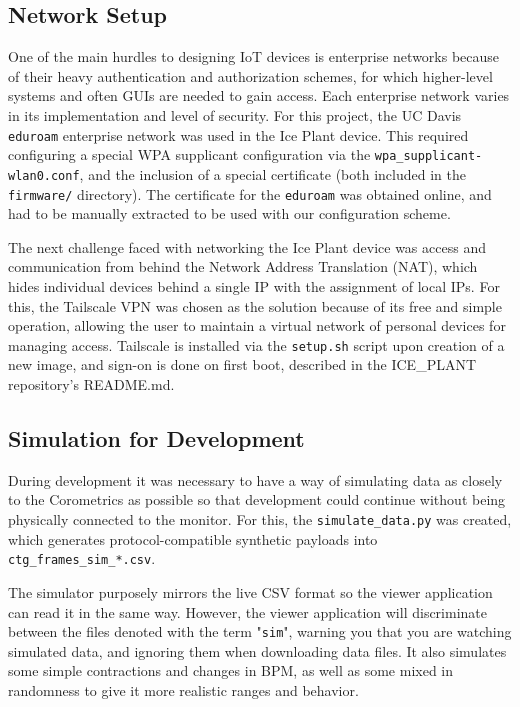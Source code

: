 \documentclass[11pt]{article}
\begin{document}
\subsection*{Network Setup}
One of the main hurdles to designing IoT devices is enterprise networks because of their heavy authentication and authorization schemes, for which higher-level systems and often GUIs are needed to gain access. Each enterprise network varies in its implementation and level of security. For this project, the UC Davis \texttt{eduroam} enterprise network was used in the Ice Plant device. This required configuring a special WPA supplicant configuration via the \texttt{wpa\_supplicant-wlan0.conf}, and the inclusion of a special certificate (both included in the \texttt{firmware/} directory). The certificate for the \texttt{eduroam} was obtained online, and had to be manually extracted to be used with our configuration scheme. 

The next challenge faced with networking the Ice Plant device was access and communication from behind the Network Address Translation (NAT), which hides individual devices behind a single IP with the assignment of local IPs. For this, the Tailscale VPN was chosen as the solution because of its free and simple operation, allowing the user to maintain a virtual network of personal devices for managing access. Tailscale is installed via the \texttt{setup.sh} script upon creation of a new image, and sign-on is done on first boot, described in the ICE\_PLANT repository's README.md. 

\subsection*{Simulation for Development}
During development it was necessary to have a way of simulating data as closely to the Corometrics as possible so that development could continue without being physically connected to the monitor. For this, the \texttt{simulate\_data.py} was created, which generates protocol-compatible synthetic payloads into \texttt{ctg\_frames\_sim\_*.csv}.

The simulator purposely mirrors the live CSV format so the viewer application can read it in the same way. However, the viewer application will discriminate between the files denoted with the term "\texttt{sim}", warning you that you are watching simulated data, and ignoring them when downloading data files. It also simulates some simple contractions and changes in BPM, as well as some mixed in randomness to give it more realistic ranges and behavior. 
\end{document}
